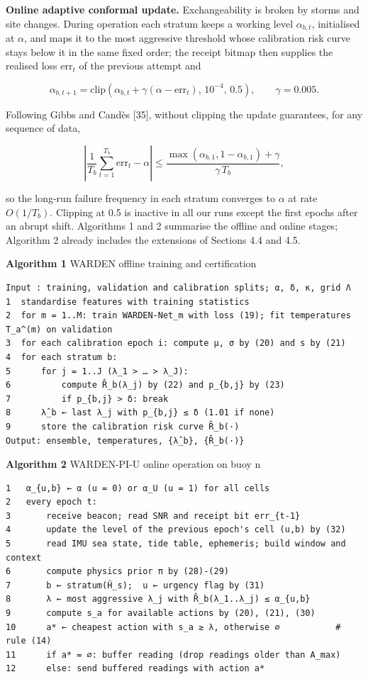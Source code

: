 \documentclass[
  11pt,
]{article}
\begin{document}
\textbf{Online adaptive conformal update.} Exchangeability is broken by
storms and site changes. During operation each stratum keeps a working
level \(\alpha_{b,t}\), initialised at \(\alpha\), and maps it to the
most aggressive threshold whose calibration risk curve stays below it in
the same fixed order; the receipt bitmap then supplies the realised loss
\(\mathrm{err}_t\) of the previous attempt and

\[\alpha_{b,t+1}=\mathrm{clip}\left(\alpha_{b,t}+\gamma(\alpha-\mathrm{err}_t),\,10^{-4},\,0.5\right),\qquad \gamma=0.005. \tag{26}\]

Following Gibbs and Candès {[}35{]}, without clipping the update
guarantees, for any sequence of data,

\[\left|\frac{1}{T_b}\sum_{t=1}^{T_b}\mathrm{err}_t-\alpha\right|\le\frac{\max(\alpha_{b,1},1-\alpha_{b,1})+\gamma}{\gamma\,T_b}, \tag{27}\]

so the long-run failure frequency in each stratum converges to
\(\alpha\) at rate \(O(1/T_b)\). Clipping at 0.5 is inactive in all our
runs except the first epochs after an abrupt shift. Algorithms 1 and 2
summarise the offline and online stages; Algorithm 2 already includes
the extensions of Sections 4.4 and 4.5.

\textbf{Algorithm 1} WARDEN offline training and certification

\begin{verbatim}
Input : training, validation and calibration splits; α, δ, κ, grid Λ
1  standardise features with training statistics
2  for m = 1..M: train WARDEN-Net_m with loss (19); fit temperatures T_a^(m) on validation
3  for each calibration epoch i: compute μ, σ by (20) and s by (21)
4  for each stratum b:
5      for j = 1..J (λ_1 > … > λ_J):
6          compute R̂_b(λ_j) by (22) and p_{b,j} by (23)
7          if p_{b,j} > δ: break
8      λ̂_b ← last λ_j with p_{b,j} ≤ δ (1.01 if none)
9      store the calibration risk curve R̂_b(·)
Output: ensemble, temperatures, {λ̂_b}, {R̂_b(·)}
\end{verbatim}

\textbf{Algorithm 2} WARDEN-PI-U online operation on buoy n

\begin{verbatim}
1   α_{u,b} ← α (u = 0) or α_U (u = 1) for all cells
2   every epoch t:
3       receive beacon; read SNR and receipt bit err_{t-1}
4       update the level of the previous epoch's cell (u,b) by (32)
5       read IMU sea state, tide table, ephemeris; build window and context
6       compute physics prior π by (28)-(29)
7       b ← stratum(Ĥ_s);  u ← urgency flag by (31)
8       λ ← most aggressive λ_j with R̂_b(λ_1..λ_j) ≤ α_{u,b}
9       compute s_a for available actions by (20), (21), (30)
10      a* ← cheapest action with s_a ≥ λ, otherwise ∅           # rule (14)
11      if a* = ∅: buffer reading (drop readings older than A_max)
12      else: send buffered readings with action a*
\end{verbatim}
\end{document}

